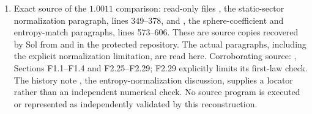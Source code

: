 \documentclass[10pt]{article}
\begin{document}
\begin{enumerate}
Wilsonian partial entropy and an ordinary reduced-state entropy.
Those actual sections are read in
.
Neither paper establishes the required identification for the
native polar source law or a graded positive-state multiplicity.
\item Exact source of the $1.0011$ comparison: read-only files
,
the static-sector normalization paragraph, lines 349--378, and
,
the sphere-coefficient and entropy-match paragraphs, lines 573--606.
These are source copies recovered by Sol from
 and
 in the protected
repository. The actual paragraphs, including the explicit
normalization limitation, are read here. Corroborating source:
,
Sections F1.1--F1.4 and F2.25--F2.29; F2.29 explicitly limits its
first-law check. The history note
,
the entropy-normalization discussion, supplies a locator rather
than an independent numerical check. No source program is executed
or represented as independently validated by this reconstruction.
\end{enumerate}
\end{document}
